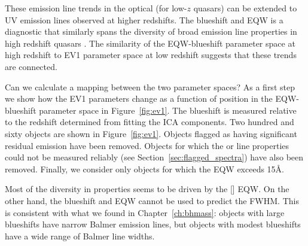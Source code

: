These emission line trends in the optical (for low-$z$ quasars) can be extended to UV emission lines observed at higher redshifts. 
The  blueshift and \ac{EQW} is a diagnostic that similarly spans the diversity of broad emission line properties in high redshift quasars \citep[dominated by a virialized component at one extreme and a wind driven component at the other][]{richards11,sulentic07}. 
The similarity of the  \ac{EQW}-blueshift parameter space at high redshift to \ac{EV1} parameter space at low redshift suggests that these trends are connected. 

Can we calculate a mapping between the two parameter spaces? 
As a first step we show how the \ac{EV1} parameters change as a function of position in the  \ac{EQW}-blueshift parameter space in Figure~\ref{fig:ev1}. 
The  blueshift is measured relative to the redshift determined from fitting the \ac{ICA} components.
Two hundred and sixty objects are shown in Figure~\ref{fig:ev1}.
Objects flagged as having significant  residual emission have been removed.  
Objects for which the \hb or  line properties could not be measured reliably (see Section~\ref{sec:flagged_spectra}) have also been removed. 
Finally, we consider only objects for which the  EQW exceeds 15\AA. 

Most of the diversity in  properties seems to be driven by the [] \ac{EQW}. 
On the other hand, the  blueshift and \ac{EQW} cannot be used to predict the \hb \ac{FWHM}. 
This is consistent with what we found in Chapter~\ref{ch:bhmass}: objects with large  blueshifts have narrow Balmer emission lines, but objects with modest  blueshifts have a wide range of Balmer line widths. 

